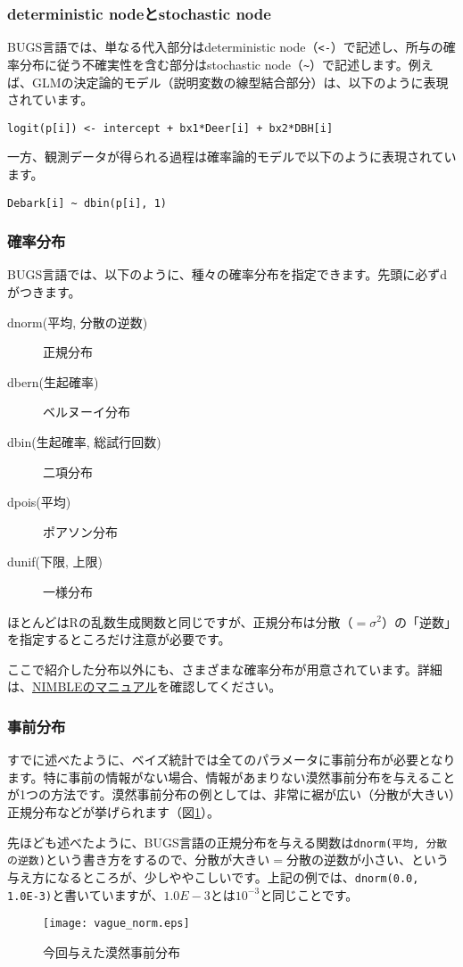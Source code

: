 		\subsubsection{deterministic nodeとstochastic node}
BUGS言語では、単なる代入部分はdeterministic node（\verb|<-|）で記述し、所与の確率分布に従う不確実性を含む部分はstochastic node（\verb|~|）で記述します。例えば、GLMの決定論的モデル（説明変数の線型結合部分）は、以下のように表現されています。
\begin{verbatim}
logit(p[i]) <- intercept + bx1*Deer[i] + bx2*DBH[i]
\end{verbatim}
一方、観測データが得られる過程は確率論的モデルで以下のように表現されています。
\begin{verbatim}
Debark[i] ~ dbin(p[i], 1)
\end{verbatim}

		\subsubsection{確率分布}
BUGS言語では、以下のように、種々の確率分布を指定できます。先頭に必ずdがつきます。
\begin{description}
  \item[dnorm(平均, 分散の逆数)]正規分布
  \item[dbern(生起確率)]ベルヌーイ分布
  \item[dbin(生起確率, 総試行回数)]二項分布
  \item[dpois(平均)]ポアソン分布
  \item[dunif(下限, 上限)]一様分布
\end{description}
ほとんどはRの乱数生成関数と同じですが、正規分布は分散（$=\sigma^2$）の「逆数」を指定するところだけ注意が必要です。

ここで紹介した分布以外にも、さまざまな確率分布が用意されています。詳細は、\href{https://r-nimble.org/manuals/NimbleUserManual_0.4.pdf}{NIMBLEのマニュアル}を確認してください。
	\subsubsection{事前分布}
すでに述べたように、ベイズ統計では全てのパラメータに事前分布が必要となります。特に事前の情報がない場合、情報があまりない漠然事前分布を与えることが1つの方法です。漠然事前分布の例としては、非常に裾が広い（分散が大きい）正規分布などが挙げられます（図\ref{vague_norm}）。

先ほども述べたように、BUGS言語の正規分布を与える関数は\verb|dnorm(平均, 分散の逆数)|という書き方をするので、分散が大きい$=$分散の逆数が小さい、という与え方になるところが、少しややこしいです。上記の例では、\verb|dnorm(0.0, 1.0E-3)|と書いていますが、$1.0E-3$とは$10^{-3}$と同じことです。
\begin{figure}[htb]
\begin{center}
\graphicspath{{3_glm/figs/}}
\texttt{[image: vague\_norm.eps]}\\
\caption{今回与えた漠然事前分布}
\label{vague_norm}
\end{center}
\end{figure}

